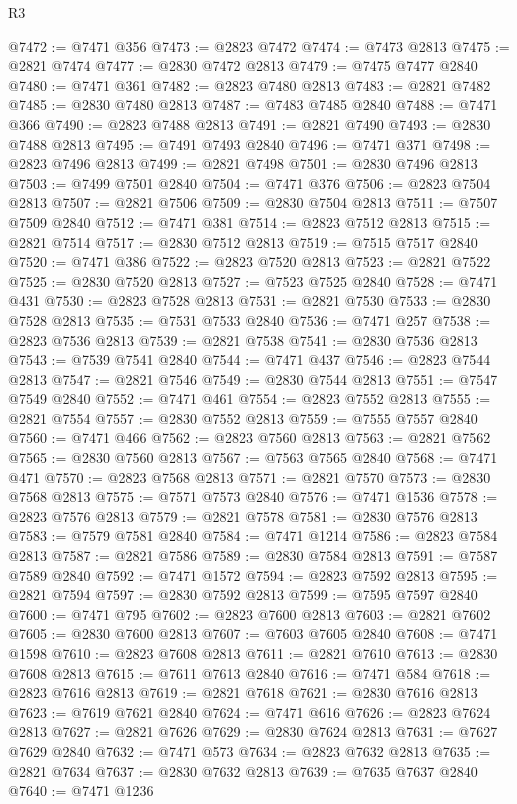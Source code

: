 \begin{lexlean}{R3}
\begin{coremodule}
@7472 := @7471 @356
@7473 := @2823 @7472
@7474 := @7473 @2813
@7475 := @2821 @7474
@7477 := @2830 @7472 @2813
@7479 := @7475 @7477 @2840
@7480 := @7471 @361
@7482 := @2823 @7480 @2813
@7483 := @2821 @7482
@7485 := @2830 @7480 @2813
@7487 := @7483 @7485 @2840
@7488 := @7471 @366
@7490 := @2823 @7488 @2813
@7491 := @2821 @7490
@7493 := @2830 @7488 @2813
@7495 := @7491 @7493 @2840
@7496 := @7471 @371
@7498 := @2823 @7496 @2813
@7499 := @2821 @7498
@7501 := @2830 @7496 @2813
@7503 := @7499 @7501 @2840
@7504 := @7471 @376
@7506 := @2823 @7504 @2813
@7507 := @2821 @7506
@7509 := @2830 @7504 @2813
@7511 := @7507 @7509 @2840
@7512 := @7471 @381
@7514 := @2823 @7512 @2813
@7515 := @2821 @7514
@7517 := @2830 @7512 @2813
@7519 := @7515 @7517 @2840
@7520 := @7471 @386
@7522 := @2823 @7520 @2813
@7523 := @2821 @7522
@7525 := @2830 @7520 @2813
@7527 := @7523 @7525 @2840
@7528 := @7471 @431
@7530 := @2823 @7528 @2813
@7531 := @2821 @7530
@7533 := @2830 @7528 @2813
@7535 := @7531 @7533 @2840
@7536 := @7471 @257
@7538 := @2823 @7536 @2813
@7539 := @2821 @7538
@7541 := @2830 @7536 @2813
@7543 := @7539 @7541 @2840
@7544 := @7471 @437
@7546 := @2823 @7544 @2813
@7547 := @2821 @7546
@7549 := @2830 @7544 @2813
@7551 := @7547 @7549 @2840
@7552 := @7471 @461
@7554 := @2823 @7552 @2813
@7555 := @2821 @7554
@7557 := @2830 @7552 @2813
@7559 := @7555 @7557 @2840
@7560 := @7471 @466
@7562 := @2823 @7560 @2813
@7563 := @2821 @7562
@7565 := @2830 @7560 @2813
@7567 := @7563 @7565 @2840
@7568 := @7471 @471
@7570 := @2823 @7568 @2813
@7571 := @2821 @7570
@7573 := @2830 @7568 @2813
@7575 := @7571 @7573 @2840
@7576 := @7471 @1536
@7578 := @2823 @7576 @2813
@7579 := @2821 @7578
@7581 := @2830 @7576 @2813
@7583 := @7579 @7581 @2840
@7584 := @7471 @1214
@7586 := @2823 @7584 @2813
@7587 := @2821 @7586
@7589 := @2830 @7584 @2813
@7591 := @7587 @7589 @2840
@7592 := @7471 @1572
@7594 := @2823 @7592 @2813
@7595 := @2821 @7594
@7597 := @2830 @7592 @2813
@7599 := @7595 @7597 @2840
@7600 := @7471 @795
@7602 := @2823 @7600 @2813
@7603 := @2821 @7602
@7605 := @2830 @7600 @2813
@7607 := @7603 @7605 @2840
@7608 := @7471 @1598
@7610 := @2823 @7608 @2813
@7611 := @2821 @7610
@7613 := @2830 @7608 @2813
@7615 := @7611 @7613 @2840
@7616 := @7471 @584
@7618 := @2823 @7616 @2813
@7619 := @2821 @7618
@7621 := @2830 @7616 @2813
@7623 := @7619 @7621 @2840
@7624 := @7471 @616
@7626 := @2823 @7624 @2813
@7627 := @2821 @7626
@7629 := @2830 @7624 @2813
@7631 := @7627 @7629 @2840
@7632 := @7471 @573
@7634 := @2823 @7632 @2813
@7635 := @2821 @7634
@7637 := @2830 @7632 @2813
@7639 := @7635 @7637 @2840
@7640 := @7471 @1236

\end{coremodule}
\end{lexlean}
